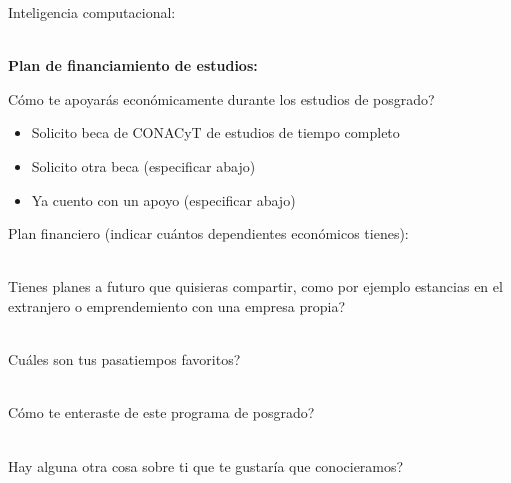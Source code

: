\documentclass{article}
\begin{document}
\begin{Form}
Inteligencia computacional: \\ \\
\TextField[name=int,multiline=true,bordercolor=black,align=0,width=\textwidth,height=8em]{}

\quad

{\bf Plan de financiamiento de estudios:}

{\textquestiondown}Cómo te apoyarás económicamente durante los
estudios de posgrado?
\begin{itemize}[itemsep=-2pt]
\item[\raisebox{-4pt}{{\ChoiceMenu[radio,radiosymbol=\ding{52},name=ec]{}{=1}}}]{Solicito
    beca de CONACyT de estudios de tiempo completo}
\item[\raisebox{-4pt}{{\ChoiceMenu[radio,radiosymbol=\ding{52},name=ec]{}{=2}}}]{Solicito
    otra beca (especificar abajo)}
\item[\raisebox{-4pt}{{\ChoiceMenu[radio,radiosymbol=\ding{52},name=ec]{}{=3}}}]{Ya cuento
    con un apoyo (especificar abajo)}
\end{itemize}

Plan financiero (indicar cuántos dependientes económicos tienes): \\ \\
\TextField[name=fin,multiline=true,bordercolor=black,align=0,width=\textwidth,height=8em]{}

\newpage

{\textquestiondown}Tienes planes a futuro que quisieras compartir,
como por ejemplo estancias en el extranjero o emprendemiento con una
empresa propia? \\ \\
\TextField[name=fut,multiline=true,bordercolor=black,align=0,width=\textwidth,height=8em]{}

{\textquestiondown}Cuáles son tus pasatiempos favoritos? \\ \\
\TextField[name=pas,multiline=true,bordercolor=black,align=0,width=\textwidth,height=8em]{}

{\textquestiondown}Cómo te enteraste de este programa de posgrado? \\ \\
\TextField[name=ent,multiline=true,bordercolor=black,align=0,width=\textwidth,height=8em]{}

{\textquestiondown}Hay alguna otra cosa sobre ti que te gustaría que conocieramos? \\ \\
\TextField[name=ent,multiline=true,bordercolor=black,align=0,width=\textwidth,height=8em]{}


\end{Form}
\end{document}
